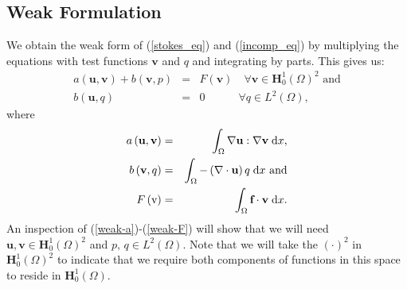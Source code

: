 \documentclass[12pt,a4paper]{article}
\theoremstyle{definition}
\begin{document}
\subsection{Weak Formulation}
We obtain the weak form of (\ref{stokes_eq}) and (\ref{incomp_eq}) by multiplying the equations with test functions $\textbf{v}$ and $q$ and integrating by parts.  This gives us:
\begin{eqnarray}
	a\left(\textbf{u},\textbf{v}\right) + b\left(\textbf{v},p\right) &=& F\left(\textbf{v}\right)\quad \forall 
\textbf{v} \in \textbf{H}^1_0\left(\Omega\right)^2 \text{ and} \\
	b\left(\textbf{u},q\right)&=&0 \quad \quad\quad\forall q \in L^2\left(\Omega\right),
\end{eqnarray}
where 
\begin{eqnarray}\label{weak-a}
	a\left(\textbf{u},\textbf{v}\right)&=&\int_{\Omega}\nabla \textbf{u} : \nabla \textbf{v}\;\mathrm{d}x \text, \\\label{weak-b}
	b\left(\textbf{v},q\right) &=& \int_{\Omega}-\left(\nabla \cdot \textbf{u}\right)q\;\mathrm{d}x \text{ and}\\\label{weak-F}
    F\left(\text{v}\right) &=& \int_{\Omega}\textbf{f}\cdot \textbf{v} \;\mathrm{d}x.
\end{eqnarray}
An inspection of (\ref{weak-a})-(\ref{weak-F}) will show that we will need $\textbf{u}, \textbf{v}\in \textbf{H}^{1}_{0}\left(\Omega\right)^2$ and $p,\, q \in L^2\left(\Omega\right)$.  Note that we will take the $(\cdot)^2$ in $\textbf{H}^{1}_{0}\left(\Omega\right)^2$ to indicate that we require both components of functions in this space to reside in $\textbf{H}^{1}_{0}\left(\Omega\right)$.
\end{document}
